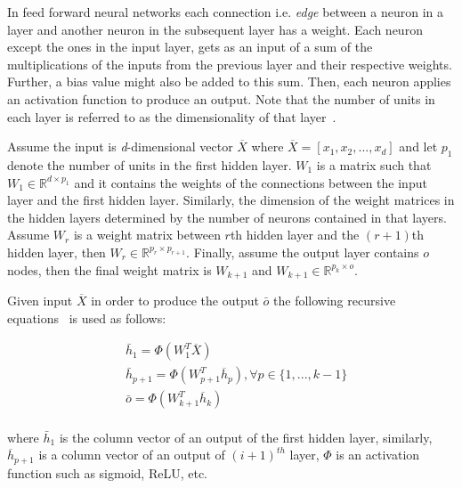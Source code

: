 In feed forward neural networks each connection i.e. \textit{edge} between a neuron in a layer and another neuron in the subsequent layer has a weight. Each neuron except the ones in the input layer, gets as an input of a sum of the multiplications of the inputs from the previous layer and their respective weights. Further, a bias value might also be added to this sum. Then, each neuron applies an activation function to produce an output. Note that the number of units in each layer is referred to as the dimensionality of that layer~\cite{DBLP:books/sp/Aggarwal18}.

Assume the input is \textit{d}-dimensional vector $\overline{X}$ where $\overline{X}=[x_1,x_2,...,x_d]$ and let $p_1$ denote the number of units in the first hidden layer. $W_1$ is a matrix such that $W_1 \in \mathbb{R}^{d\times p_1}$  and it contains the weights of the connections between the input layer and the first hidden layer. Similarly, the dimension of the weight matrices in the hidden layers determined by the number of neurons contained in that layers. Assume $W_r$ is a weight matrix between $r$th hidden layer and the $(r+1)$th hidden layer, then $W_r \in \mathbb{R}^{p_r\times p_{r+1}}$. Finally, assume the output layer contains $o$ nodes, then the final weight matrix is $W_{k+1}$ and $W_{k+1} \in \mathbb{R}^{p_k\times o}$. 

Given input $\overline{X}$ in order to produce the output $\bar{o}$ the following recursive equations~\cite{DBLP:books/sp/Aggarwal18} is used as follows:

\begin{align*}
& \bar{h}_1= \Phi (W_1^{T} \overline{X}) \\
& \bar{h}_{p+1}= \Phi (W_{p+1}^{T} \overline{h}_p), \forall p \in \{1,...,k-1\} \\
& \bar{o}=\Phi (W_{k+1}^{T} \overline{h}_k)
\end{align*}\\ 
where $\bar{h}_1$ is the column vector of an output of the first hidden layer, similarly, $\overline{h}_{p+1}$ is a column vector of an output of ${(i+1)}^{th}$ layer,
$\Phi$ is an activation function such as sigmoid, ReLU, etc.  

